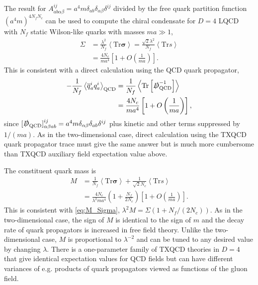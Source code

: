\documentclass[%
    twocolumn,
superscriptaddress,
preprintnumbers,
nofootinbib,
 amsmath,amssymb,
 aps,
 prd,
 floatfix,
]{revtex4-2}
\newcommand{\qcd}[0]{\text{QCD}}
\begin{document}
The result for $A_{ab\alpha\beta}^{ij} = a^4 m \delta_{ab}\delta_{\alpha\beta}\delta^{ij}$  divided by the free quark partition function $(a^4 m)^{4N_f N_c}$ can be used to compute the chiral condensate for $D=4$ LQCD with $N_f$ static Wilson-like quarks with masses $m a \gg 1$,
\begin{equation}
  \begin{split}
    \Sigma &= \frac{\lambda^2}{N_f}\left< \text{Tr}\bm{\sigma} \right> = \frac{\sqrt{2} \lambda^2}{N_f} \left< \text{Tr}s \right> \\
    &= \frac{4 N_c}{m a^4} \left[ 1 + O\left(\frac{1}{m a}\right) \right].
  \end{split}
\end{equation}
This is consistent with a direct calculation using the QCD quark propagator,
\begin{equation}
  \begin{split}
    -\frac{1}{N_f}\left< \overline{q}^i_a q^i_a \right>_{\qcd} &= \frac{1}{N_f} \left< \text{Tr}\left[ \slashed{D}_{\qcd}^{-1} \right] \right> \\
    &= \frac{4 N_c}{m a^4} \left[ 1 + O\left(\frac{1}{m a}\right) \right],
  \end{split}
\end{equation}
since $[\slashed{D}_{\qcd}]_{\alpha\beta ab}^{ij} = a^4 m \delta_{\alpha\beta}\delta_{ab}\delta^{ij}$ plus kinetic and other terms suppressed by $1/(ma)$.
As in the two-dimensional case, direct calculation using the TXQCD quark propagator trace must give the same answer but is much more cumbersome than TXQCD auxiliary field expectation value above.

The constituent quark mass is
\begin{equation}
  \begin{split}
    M &= \frac{1}{N_f}\left< \text{Tr}\bm{\sigma} \right> + \frac{1}{\sqrt{2} N_c} \left< \text{Tr} s \right> \\
    &= \frac{4 N_c}{\lambda^2 m a^4}\left( 1 + \frac{N_f}{2N_c} \right) \left[ 1 + O\left(\frac{1}{m a}\right) \right].
  \end{split}
\end{equation}
This is consistent with \cref{eq:M_Sigma}, $\lambda^2 M = \Sigma (1 + N_f/(2N_c))$.
As in the two-dimensional case, the sign of $M$ is identical to the sign of $m$ and the decay rate of quark propagators is increased in free field theory.
Unlike the two-dimensional case, $M$ is proportional to $\lambda^{-2}$ and can be tuned to any desired value by changing $\lambda$.
There is a one-parameter family of TXQCD theories in $D=4$ that give identical expectation values for QCD fields but can have different variances of e.g. products of quark propagators viewed as functions of the gluon field.  


\end{document}
